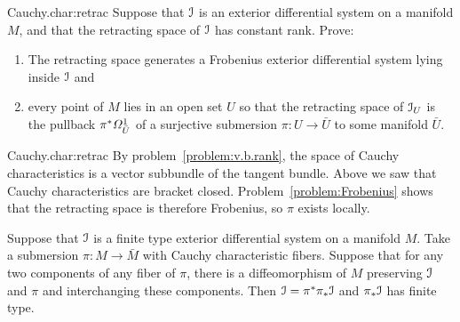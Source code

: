 \begin{problem}{Cauchy.char:retrac}
Suppose that \(\mathcal{I}\) is an exterior differential system on a manifold \(M\), and that the retracting space of \(\mathcal{I}\) has constant rank.
Prove: 
\begin{enumerate}
\item
The retracting space generates a Frobenius exterior differential system lying inside \(\mathcal{I}\) and
\item
every point of \(M\) lies in an open set \(U\) so that the retracting space of \(\mathcal{I}_U\) is the pullback \(\pi^*\Omega^{1}_{\bar{U}}\) of a surjective submersion \(\pi \colon U \to \bar{U}\) to some manifold \(\bar{U}\).
\end{enumerate}
\end{problem}
\begin{answer}{Cauchy.char:retrac}
By problem~\vref{problem:v.b.rank}, the space of Cauchy characteristics is a vector subbundle of the tangent bundle.
Above we saw that Cauchy characteristics are bracket closed.
Problem~\vref{problem:Frobenius} shows that the retracting space is therefore Frobenius, so \(\pi\) exists locally.
\end{answer}
\begin{theorem}\label{theorem:quotient}
Suppose that \(\mathcal{I}\) is a finite type exterior differential system on a manifold \(M\).
Take a submersion \(\pi \colon M \to \bar{M}\) with Cauchy characteristic fibers.
Suppose that for any two components of any fiber of \(\pi\), there is a diffeomorphism of \(M\) preserving \(\mathcal{I}\) and \(\pi\) and interchanging these components.
Then \(\mathcal{I}=\pi^*\pi_*\mathcal{I}\) and \(\pi_*\mathcal{I}\) has finite type.
\end{theorem}
